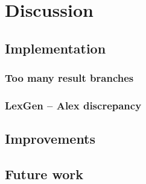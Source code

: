 \chapter{Discussion}

\section{Implementation}
\subsection{Too many result branches}
\subsection{LexGen -- Alex discrepancy}

\section{Improvements}
\section{Future work}
